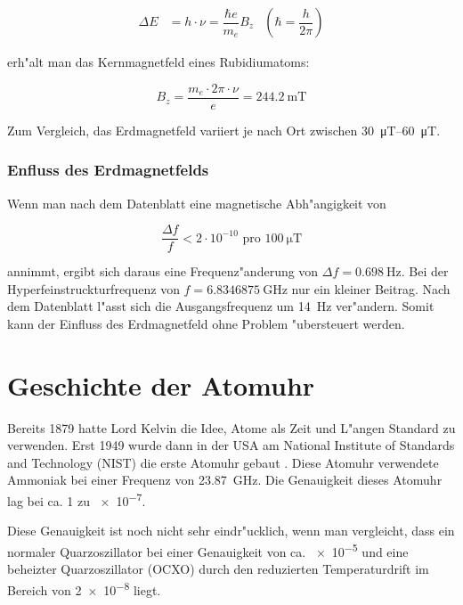 \begin{refsection}
\begin{align*}
  \Delta E &= h\cdot\nu = \dfrac{\hbar e}{m_e}B_z
           &\left(\hbar = \dfrac{h}{2\pi}\right)
\end{align*}

erh"alt man das Kernmagnetfeld eines Rubidiumatoms:

\begin{equation*}
  B_z = \dfrac{m_e\cdot2\pi\cdot\nu}{e} = \SI{244.2}{\milli\tesla}
\end{equation*}

Zum Vergleich, das Erdmagnetfeld variiert je nach Ort zwischen
\SIrange[range-phrase={ bis }, range-units=single]{30}{60}{\micro\tesla}.

\subsubsection{Enfluss des Erdmagnetfelds}
Wenn man nach dem Datenblatt \cite{datasheet:prs10m} eine magnetische
Abh"angigkeit von

\begin{equation*}
  \dfrac{\Delta f}{f} < 2\cdot 10^{-10} \text{ pro } \SI{100}{\micro\tesla}
\end{equation*}

annimmt, ergibt sich daraus eine Frequenz"anderung von \(\Delta
f=\SI{0.698}{\hertz}\).  Bei der Hyperfeinstruckturfrequenz von \(f =
\SI{6.8346875}{\giga\hertz}\) nur ein kleiner Beitrag.  Nach dem
Datenblatt l"asst sich die Ausgangsfrequenz um \SI{14}{\hertz}
ver"andern.  Somit kann der Einfluss des Erdmagnetfeld ohne Problem
"ubersteuert werden.

\section{Geschichte der Atomuhr}
\label{sec:gesch-der-atom}
Bereits 1879 hatte Lord Kelvin die Idee, Atome als Zeit und L"angen
Standard zu verwenden.  Erst 1949 wurde dann in der USA am National
Institute of Standards and Technology (NIST) die erste Atomuhr gebaut
\cite{ieee:nist}.  Diese Atomuhr verwendete Ammoniak bei einer
Frequenz von \SI{23.87}{\giga\hertz}.  Die Genauigkeit dieses Atomuhr
lag bei ca. 1 zu \num{e-7}.

Diese Genauigkeit ist noch nicht sehr eindr"ucklich, wenn man
vergleicht, dass ein normaler Quarzoszillator bei einer Genauigkeit
von ca. \num{e-5} und eine beheizter Quarzoszillator (OCXO) durch den
reduzierten Temperaturdrift im Bereich von \num{2e-8} liegt.


\end{refsection}
